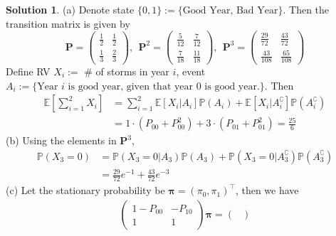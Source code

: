 \documentclass[a4paper, 10pt]{article}
\theoremstyle{definition}
\theoremstyle{hSol}
\newtheorem*{solution}{Solution}
\begin{document}
\begin{solution} (a) Denote state $\{0,1\}:=\{\text{Good Year, Bad Year}\}$. Then the transition matrix is given by
\begin{equation}
  \bm{P}=\begin{pmatrix}
    \frac{1}{2} & \frac{1}{2} \\[5pt]
    \frac{1}{3} & \frac{2}{3}
  \end{pmatrix}, ~~
  \bm{P}^2=\begin{pmatrix}
    \frac{5}{12} & \frac{7}{12} \\[5pt]
    \frac{7}{18} & \frac{11}{18}
  \end{pmatrix}, ~~
  \bm{P}^3=\begin{pmatrix}
    \frac{29}{72} & \frac{43}{72} \\[5pt]
    \frac{43}{108} & \frac{65}{108}
  \end{pmatrix}
\end{equation}
Define RV $X_i:=$ \# of storms in year $i$, event $A_i:=\{\text{Year $i$ is good year, given that year 0 is good year.}\}$. Then
\begin{equation}
  \begin{split}
    \mathbb{E}\left[\sum_{i=1}^2 X_i\right] &= \sum_{i=1}^2 \mathbb{E}\left[X_i|A_i\right]\mathbb{P}\left(A_i\right) + \mathbb{E}[X_i|A_i^{\complement}]\mathbb{P}(A_i^{\complement}) \\
    & = 1\cdot (P_{00}+P_{00}^2) + 3\cdot (P_{01} + P_{01}^2) = \frac{25}{6}
  \end{split}
\end{equation}
(b) Using the elements in $\bm{P}^3$,
\begin{equation}
  \begin{split}
    \mathbb{P}\left(X_3=0\right) &= \mathbb{P}\left(X_3=0|A_3\right)\mathbb{P}\left(A_3\right) + \mathbb{P}(X_3=0|A_3^{\complement})\mathbb{P}(A_3^{\complement})\\
    &= \frac{29}{72}e^{-1} + \frac{43}{72}e^{-3}
  \end{split}
\end{equation}
(c) Let the stationary probability be $\bm{\pi}=(\pi_0, \pi_1)^{\top}$, then we have
\begin{equation}
  \begin{split}
    \begin{pmatrix}
      1-P_{00} & -P_{10}\\[5pt]
      1 & 1
    \end{pmatrix} \bm{\pi} 
    = \begin{pmatrix}

\end{pmatrix}
\end{split}
\end{equation}
\end{solution}
\end{document}
